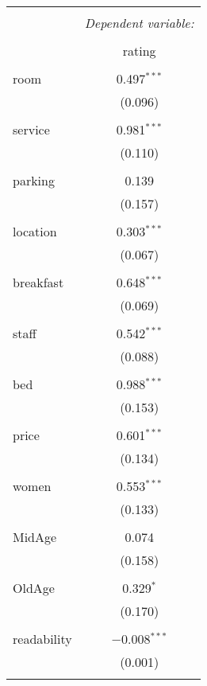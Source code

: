 \documentclass{article}
\begin{document}
\begin{table}[!htbp] \centering 
	\caption{} 
	\label{} 
	\begin{tabular}{@{\extracolsep{5pt}}lc} 
		\\[-1.8ex]\hline 
		\hline \\[-1.8ex] 
		& \multicolumn{1}{c}{\textit{Dependent variable:}} \\ 
		\cline{2-2} 
		\\[-1.8ex] & rating \\ 
		\hline \\[-1.8ex] 
		room & 0.497$^{***}$ \\ 
		& (0.096) \\ 
		& \\ 
		service & 0.981$^{***}$ \\ 
		& (0.110) \\ 
		& \\ 
		parking & 0.139 \\ 
		& (0.157) \\ 
		& \\ 
		location & 0.303$^{***}$ \\ 
		& (0.067) \\ 
		& \\ 
		breakfast & 0.648$^{***}$ \\ 
		& (0.069) \\ 
		& \\ 
		staff & 0.542$^{***}$ \\ 
		& (0.088) \\ 
		& \\ 
		bed & 0.988$^{***}$ \\ 
		& (0.153) \\ 
		& \\ 
		price & 0.601$^{***}$ \\ 
		& (0.134) \\ 
		& \\ 
		women & 0.553$^{***}$ \\ 
		& (0.133) \\ 
		& \\ 
		MidAge & 0.074 \\ 
		& (0.158) \\ 
		& \\ 
		OldAge & 0.329$^{*}$ \\ 
		& (0.170) \\ 
		& \\ 
		readability & $-$0.008$^{***}$ \\ 
		& (0.001) \\ 
		& \\ 

\end{tabular}
\end{table}
\end{document}
